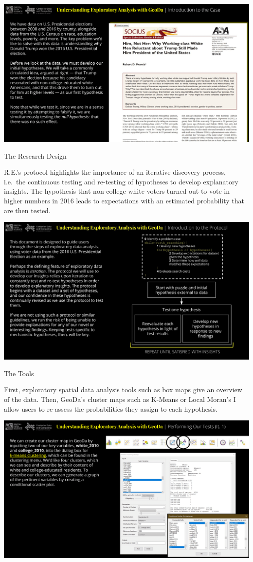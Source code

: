\documentclass[
]{book}
\begin{document}
\includegraphics{images/elections2.png}

The Research Design

R.E.'s protocol highlights the importance of an iterative discovery process, i.e.~the continuous testing and re-testing of hypotheses to develop explanatory insights. The hypothesis that non-college white voters turned out to vote in higher numbers in 2016 leads to expectations with an estimated probability that are then tested.

\includegraphics{images/elections3.jpg}

The Tools

First, exploratory spatial data analysis tools such as box maps give an overview of the data. Then, GeoDa's cluster maps such as K-Means or Local Moran's I allow users to re-assess the probabilities they assign to each hypothesis.

\includegraphics{images/elections4.png}
\end{document}
